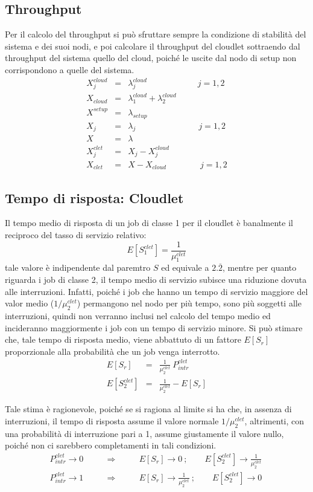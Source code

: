 \subsection{Throughput}
Per il calcolo del throughput si può sfruttare sempre la condizione di stabilità
del sistema e dei suoi nodi, e poi calcolare il throughput del cloudlet
sottraendo dal throughput del sistema quello del cloud, poiché le uscite dal
nodo di setup non corrispondono a quelle del sistema.
\begin{eqnarray}
X_j^{cloud} &=& \lambda_j^{cloud}   \qquad\quad\qquad\quad j=1,2 \\
X_{cloud} &=& \lambda_1^{cloud} + \lambda_2^{cloud}   \\
X^{setup} &=& \lambda_{setup}   \\
X_j &=& \lambda_j  \ \quad\qquad\quad\qquad \ \quad j=1,2 \\
X &=& \lambda \\
X_j^{clet} &=& X_j - X_j^{cloud} \\
X_{clet} &=& X - X_{cloud} \quad\qquad\quad j=1,2
\end{eqnarray}
\subsection{Tempo di risposta: Cloudlet}
Il tempo medio di risposta di un job di classe 1 per il cloudlet è banalmente il
reciproco del tasso di servizio relativo:
\begin{equation}
E[S_1^{clet}] = \frac{1}{\mu_1^{clet}}
\end{equation}
tale valore è indipendente dal paremtro $S$ ed equivale a $2.\overline2$, mentre
per quanto riguarda i job di classe 2, il tempo medio di servizio subisce una
riduzione dovuta alle interruzioni. Infatti, poiché i job che hanno un tempo
di servizio maggiore del valor medio ($1/\mu_2^{clet}$) permangono nel nodo per
più tempo, sono più soggetti alle interruzioni, quindi
non verranno inclusi nel calcolo del tempo medio ed incideranno maggiormente i
job con un tempo di servizio minore.
Si può stimare che, tale tempo di risposta medio, viene abbattuto di un fattore
$E[S_r]$ proporzionale alla probabilità che un job venga interrotto.
\begin{eqnarray}
E[S_r] &=& \frac{1}{\mu_2^{clet}} \ P_{intr}^{clet}  \nonumber \\
E[S_2^{clet}] &=& \frac{1}{\mu_2^{clet}} - E[S_r]
\end{eqnarray}

Tale stima è ragionevole, poiché se si ragiona al limite si ha che, in assenza di
interruzioni, il tempo di risposta assume il valore normale $1/\mu_2^{clet}$,
altrimenti, con una probabilità di interruzione pari a 1, assume giustamente il
valore nullo, poiché non ci sarebbero completamenti in tali condizioni.
\begin{eqnarray*}
P_{intr}^{clet} \longrightarrow 0 \qquad & \Rightarrow \qquad & 
E[S_r] \rightarrow 0 \ ; \qquad E[S_2^{clet}] \rightarrow
\frac{1}{\mu_2^{clet}} \ \\
P_{intr}^{clet} \longrightarrow 1 \qquad & \Rightarrow \qquad & 
E[S_r] \rightarrow \frac{1}{\mu_2^{clet}} \ ; \qquad E[S_2^{clet}] \rightarrow 0
\end{eqnarray*}

